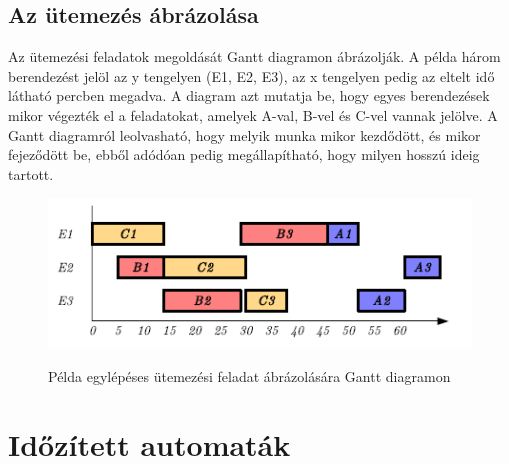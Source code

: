 \documentclass {report}
\begin{document}
\section{Az ütemezés ábrázolása}
Az ütemezési feladatok megoldását Gantt diagramon ábrázolják. A példa három berendezést jelöl az y tengelyen (E1, E2, E3), az x tengelyen pedig az eltelt idő látható percben megadva. A diagram azt mutatja be, hogy egyes berendezések mikor végezték el a feladatokat, amelyek A-val, B-vel és C-vel vannak jelölve. A Gantt diagramról leolvasható, hogy melyik munka mikor kezdődött, és mikor fejeződött be, ebből adódóan pedig megállapítható, hogy milyen hosszú ideig tartott. \cite{Ghaeli2005}
\begin{figure}[h]
\begin{center}
\includegraphics{gantt}\\
\caption{Példa egylépéses ütemezési feladat ábrázolására Gantt diagramon}
\end{center}
\end{figure}

 

\chapter{Időzített automaták}
\end{document}
